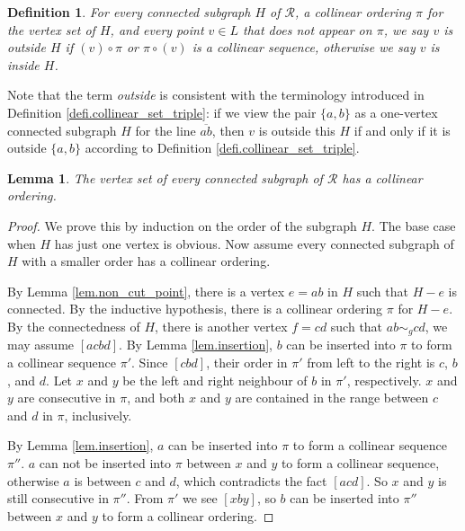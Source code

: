 \documentclass[12pt]{article}
\newcommand{\ov}{\overline}
\newtheorem{lem}{Lemma}
\newtheorem{defi}{Definition}
\begin{document}
\begin{defi}
For every connected subgraph $H$ of $\mathcal{R}$,
a collinear ordering $\pi$ for the vertex set of $H$,
and every point $v \in L$ that does not appear on $\pi$,
we say $v$ is {\em outside} $H$ if $(v) \circ \pi$ or $\pi \circ (v)$ is a collinear sequence,
otherwise we say $v$ is {\em inside} $H$.
\end{defi}

Note that the term {\em outside} is consistent with the terminology introduced in Definition \ref{defi.collinear_set_triple}: 
if we view the pair $\{a, b\}$ as a one-vertex connected subgraph $H$ for the line $\ov{ab}$, 
then $v$ is outside this $H$ if and only if it is outside $\{a, b\}$ according to Definition \ref{defi.collinear_set_triple}.

\begin{lem}\label{lemma.P_line}
The vertex set of every connected subgraph of $\mathcal{R}$ has a collinear ordering.
\end{lem}

\begin{proof}
We prove this by induction on the order of the subgraph $H$. The base case when $H$ has
just one vertex is obvious. Now assume every connected subgraph of $H$ with a smaller order
has a collinear ordering.

By Lemma \ref{lem.non_cut_point}, there is a vertex $e = ab$ in $H$
such that $H-e$ is connected. By the inductive hypothesis, 
there is a collinear ordering $\pi$ for $H-e$.
By the connectedness of $H$, there is another vertex
$f = cd$ such that $ab \sim_g cd$,
we may assume $[acbd]$.
By Lemma \ref{lem.insertion},
$b$ can be inserted into $\pi$ to form a collinear sequence $\pi'$.
Since $[cbd]$, their order in $\pi'$ from left to the right is $c$, $b$, and $d$.
Let $x$ and $y$ be the left and right neighbour of $b$ in $\pi'$,
respectively.
$x$ and $y$ are consecutive in $\pi$, and both $x$ and $y$ are contained in the
range between $c$ and $d$ in $\pi$, inclusively.

By Lemma \ref{lem.insertion},
$a$ can be inserted into $\pi$ to form a collinear sequence $\pi''$.
$a$ can not be inserted into $\pi$ between $x$ and $y$ to form a collinear sequence,
otherwise $a$ is between $c$ and $d$, which contradicts the fact $[acd]$.
So $x$ and $y$ is still consecutive in $\pi''$. From $\pi'$ we see $[xby]$,
so $b$ can be inserted into $\pi''$ between $x$ and $y$ to form a collinear ordering.
\end{proof}
\end{document}
